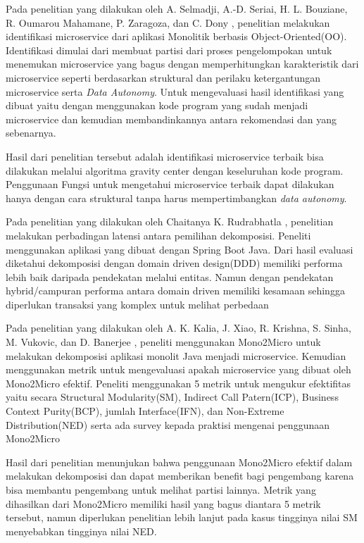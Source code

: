 \endgroup
Pada penelitian yang dilakukan oleh  A. Selmadji, A.-D. Seriai, H. L. Bouziane, R. Oumarou Mahamane, P. Zaragoza, dan C. Dony \cite{5B1}, penelitian melakukan identifikasi microservice dari aplikasi Monolitik berbasis Object-Oriented(OO). Identifikasi  dimulai dari membuat partisi dari proses pengelompokan untuk menemukan microservice yang bagus dengan memperhitungkan karakteristik dari microservice seperti berdasarkan struktural dan perilaku ketergantungan microservice serta \textit{Data Autonomy}. Untuk mengevaluasi hasil identifikasi yang dibuat yaitu dengan menggunakan kode program yang sudah menjadi microservice dan kemudian membandinkannya antara rekomendasi dan yang sebenarnya. 

Hasil dari penelitian tersebut adalah identifikasi microservice terbaik bisa dilakukan melalui algoritma gravity center dengan keseluruhan kode program. Penggunaan Fungsi untuk mengetahui microservice terbaik dapat dilakukan hanya dengan cara struktural tanpa harus mempertimbangkan \textit{data autonomy}.

Pada penelitian yang dilakukan oleh Chaitanya K. Rudrabhatla \cite{6C1}, penelitian melakukan perbadingan latensi antara pemilihan dekomposisi. Peneliti menggunakan aplikasi yang dibuat dengan Spring Boot Java. Dari hasil evaluasi diketahui dekomposisi dengan domain driven design(DDD)  memiliki performa lebih baik daripada pendekatan melalui entitas. Namun dengan pendekatan hybrid/campuran performa antara domain driven memiliki kesamaan sehingga diperlukan transaksi yang komplex untuk melihat perbedaan

Pada penelitian yang dilakukan oleh A. K. Kalia, J. Xiao, R. Krishna, S. Sinha, M. Vukovic, dan D. Banerjee \cite{8EA}, peneliti menggunakan Mono2Micro untuk melakukan dekomposisi aplikasi monolit Java menjadi microservice. Kemudian menggunakan metrik untuk mengevaluasi apakah microservice yang dibuat oleh Mono2Micro efektif. Peneliti menggunakan 5 metrik untuk mengukur efektifitas yaitu  secara Structural Modularity(SM), Indirect Call Patern(ICP), Business Context Purity(BCP), jumlah Interface(IFN), dan Non-Extreme Distribution(NED) serta ada survey kepada praktisi mengenai penggunaan Mono2Micro

Hasil dari penelitian menunjukan bahwa penggunaan Mono2Micro efektif dalam melakukan dekomposisi dan dapat memberikan benefit bagi pengembang karena bisa membantu pengembang untuk melihat partisi lainnya. Metrik yang dihasilkan dari Mono2Micro memiliki hasil yang bagus diantara 5 metrik tersebut, namun diperlukan penelitian lebih lanjut pada kasus tingginya nilai SM menyebabkan tingginya nilai NED.

